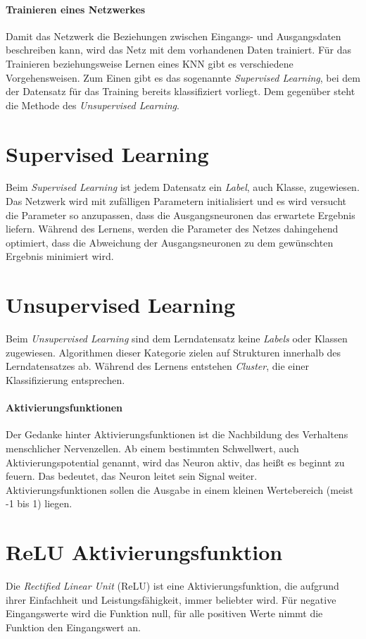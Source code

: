 \documentclass[11pt]{article}
\begin{document}
\subsubsection{Trainieren eines Netzwerkes}

Damit das Netzwerk die Beziehungen zwischen Eingangs- und Ausgangsdaten beschreiben kann, wird das Netz mit dem vorhandenen Daten trainiert. Für das Trainieren beziehungsweise Lernen eines KNN gibt es verschiedene Vorgehensweisen. Zum Einen gibt es das sogenannte \textit{Supervised Learning}, bei dem der Datensatz für das Training bereits klassifiziert vorliegt. Dem gegenüber steht die Methode des \textit{Unsupervised Learning}.

\chapter{Supervised Learning}
Beim \textit{Supervised Learning} ist jedem Datensatz ein \textit{Label}, auch Klasse, zugewiesen. Das Netzwerk wird mit zufälligen Parametern initialisiert und es wird versucht die Parameter so anzupassen, dass die Ausgangsneuronen das erwartete Ergebnis liefern. Während des Lernens, werden die Parameter des Netzes dahingehend optimiert, dass die Abweichung der Ausgangsneuronen zu dem gewünschten Ergebnis minimiert wird.\parencite{Pattanayak2017}

\chapter{Unsupervised Learning}
Beim \textit{Unsupervised Learning} sind dem Lerndatensatz keine \textit{Labels} oder Klassen zugewiesen. Algorithmen dieser Kategorie zielen auf Strukturen innerhalb des Lerndatensatzes ab. Während des Lernens entstehen \textit{Cluster}, die einer Klassifizierung entsprechen.\parencite{Pattanayak2017}

\subsubsection{Aktivierungsfunktionen}
Der Gedanke hinter Aktivierungsfunktionen ist die Nachbildung des Verhaltens menschlicher Nervenzellen. Ab einem bestimmten Schwellwert, auch Aktivierungspotential  genannt, wird das Neuron aktiv, das heißt es beginnt zu feuern. Das bedeutet, das Neuron leitet sein Signal weiter. Aktivierungsfunktionen sollen die Ausgabe in einem kleinen Wertebereich (meist -1 bis 1) liegen.\parencite{Manaswi2018}

\chapter{ReLU Aktivierungsfunktion}
Die \textit{Rectified Linear Unit} (ReLU) ist eine Aktivierungsfunktion, die aufgrund ihrer Einfachheit und Leistungsfähigkeit, immer beliebter wird. Für negative Eingangswerte wird die Funktion null, für alle positiven Werte nimmt die Funktion den Eingangswert an.\parencite{M.AnderssonM.Arvola}
\end{document}
